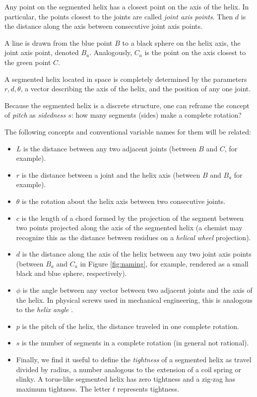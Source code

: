 \documentclass[11pt]{article}
\begin{document}
{Any point on the segmented helix has a closest point on the axis of the helix.
In particular, the points closest to the
joints are called {\em joint axis points}.
Then $d$ is the distance along the axis between consecutive joint axis points.

A line is drawn from the blue point $B$ to a black sphere on the helix axis,
the joint axis point, denoted $B_a$. Analogously, $C_a$ is the point
on the axis closest to the green point $C$.


A segmented helix located in space is completely determined by
the parameters $r,d,\theta$,
a vector describing the axis
of the helix, and the position of any one joint.

Because the segmented helix is a discrete structure, one can reframe the concept of {\em pitch} as {\em sidedness $s$}:
how many segments (sides)
make a complete rotation?

The following concepts and conventional variable names for them will be related:
\begin{itemize}
\item $L$ is the distance between any two adjacent joints (between $B$ and $C$, for example).
  \item $r$ is the distance between a joint and the helix axis (between $B$ and $B_a$ for example).
  \item $\theta$ is the rotation about the helix axis between two consecutive joints.
  \item $c$ is the length of a chord formed by the projection of the segment between two points projected along the axis of the segmented helix (a chemist may recognize this as the distance between residues on a {\em helical wheel} projection).
  \item $d$ is the distance along the axis of the helix between any two joint axis points (between $B_a$ and $C_a$ in Figure \ref{fig:naming}, for example, rendered as a small black and blue
    sphere, respectively).
\item $\phi$ is the angle between any vector between two adjacent joints and the axis of the helix. In physical screws used in mechanical engineering, this is analogous to the {\em helix angle} \cite{wiki:helixangle}.
  \item $p$ is the pitch of the helix, the distance traveled in one complete rotation.
  \item $s$ is the number of segments in a complete rotation (in general not rational).
\item  Finally, we find it useful to define the {\em tightness} of a segmented helix
as travel divided by radius, a number
analogous to the extension of a coil spring or slinky.
A torus-like segmented helix has zero tightness and a zig-zag has
maximum tightness. The letter $t$ represents tightness.


\end{itemize}}
\end{document}

